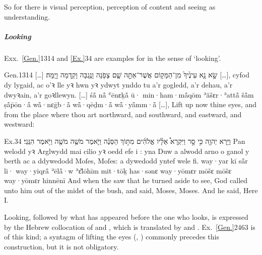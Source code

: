 \begin{paper}
	So for  there is visual perception, perception of content and seeing as understanding.
\end{paper}



\paragraph{}

\subparagraph{Looking}

\begin{paper}
	Exx.~\vref{Gen.}{13}{14}{} and \vref{Ex.}{3}{4}{} are examples for  in the sense of ‘looking’.
\end{paper}

\begin{example}{Gen.}{13}{14}{}{}
	\quoling
	{[…] שָׂ֣א נָ֤א עֵינֶ֙יךָ֙  מִן־הַמָּק֖וֹם אֲשֶׁר־אַתָּ֣ה שָׁ֑ם צָפֹ֥נָה וָנֶ֖גְבָּה וָקֵ֥דְמָה וָיָֽמָּה׃}
	{[…], cyfod dy lygaid, ac  o’ꝛ lle yꝛ hwn yꝛ ydwyt ynddo tu a’r gogledd, a’r dehau, a’r dwyꝛain, a’r goꝛllewyn.}
	{[…] śå̄ nå̄ ʿēnɛḵå̄ ū· min·ham·må̄qōm ʾăšɛr·ʾattå̄ šå̄m ṣå̄p̄ōn·å̄ wå̄·nɛḡb·å̄ wå̄·qēḏm·å̄ wå̄·yå̄mm·å̄}
	{[…], Lift up now thine eyes, and  from the place where thou art northward, and southward, and eastward, and westward:}
\end{example}

\begin{example}{Ex.}{3}{4}{}{}
	\quoling
	{וַיַּ֥רְא יְהוָ֖ה כִּ֣י סָ֣ר  וַיִּקְרָא֩ אֵלָ֨יו אֱלֹהִ֜ים מִתּ֣וֹךְ הַסְּנֶ֗ה וַיֹּ֛אמֶר מֹשֶׁ֥ה מֹשֶׁ֖ה וַיֹּ֥אמֶר הִנֵּֽנִי׃}
	{Pan welodd yꝛ Arglwydd mai cilio yꝛ oedd efe i : yna Duw a alwodd arno o ganol y berth ac a ddywedodd Moſes, Moſes: a dywedodd yntef wele fi.}
	{way·yar {\YHWH} kī så̄r li· way·yiqrå̄ ʾēlå̄·w ʾɛ̆lōhīm mit·tōḵ has·sənɛ way·yōmɛr mōšɛ mōšɛ way·yōmɛr hinnēnī}
	{And when the {\LORD} saw that he turned aside to see, God called unto him out of the midst of the bush, and said, Moses, Moses. And he said, Here  I.}
\end{example}

\begin{paper}
	Looking, followed by what has appeared before the one who looks, is expressed by the Hebrew collocation of  and , which is translated by  and . Ex.~\vref{Gen.}{24}{63}{} is of this kind; a syntagm of lifting the eyes (, ) commonly precedes this construction, but it is not obligatory.
\end{paper}

